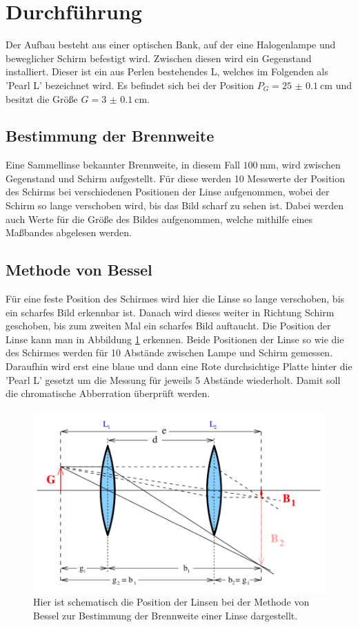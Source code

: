 \section{Durchführung}
\label{sec:Durchführung}
Der Aufbau besteht aus einer optischen Bank, auf der eine Halogenlampe und beweglicher Schirm befestigt wird. 
Zwischen diesen wird ein Gegenstand installiert. 
Dieser ist ein aus Perlen bestehendes L, welches im Folgenden als 'Pearl L' bezeichnet wird.
Es befindet sich bei der Position $P_G=\qty{25(0.1)}{\centi\meter}$ und besitzt die Größe $G=\qty{3(0.1)}{\centi\meter}$.

\subsection{Bestimmung der Brennweite}
Eine Sammellinse bekannter Brennweite, in diesem Fall $\qty{100}{\milli\meter}$, wird zwischen Gegenstand und Schirm aufgestellt.
Für diese werden 10 Messwerte der Position des Schirms bei verschiedenen Positionen der Linse aufgenommen, wobei der Schirm so lange verschoben wird, bis das Bild scharf zu sehen ist.
Dabei werden auch Werte für die Größe des Bildes aufgenommen, welche mithilfe eines Maßbandes abgelesen werden.

\subsection{Methode von Bessel}
Für eine feste Position des Schirmes wird hier die Linse so lange verschoben, bis ein scharfes Bild erkennbar ist. 
Danach wird dieses weiter in Richtung Schirm geschoben, bis zum zweiten Mal ein scharfes Bild auftaucht.
Die Position der Linse kann man in Abbildung \ref{fig:Bessel} erkennen.
Beide Positionen der Linse so wie die des Schirmes werden für 10 Abstände zwischen Lampe und Schirm gemessen.
Daraufhin wird erst eine blaue und dann eine Rote durchsichtige Platte hinter die 'Pearl L' gesetzt um die Messung für jeweils 5 Abstände wiederholt.
Damit soll die chromatische Abberration überprüft werden.

\begin{figure}[H]
    \includegraphics{Bilder/Bessel.png}
    \caption{Hier ist schematisch die Position der Linsen bei der Methode von Bessel zur Bestimmung der Brennweite einer Linse dargestellt. \cite{V408}}
    \label{fig:Bessel}
\end{figure}


